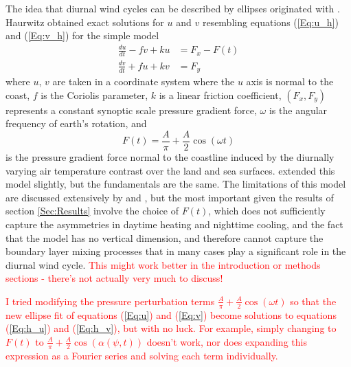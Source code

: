 \documentclass{ametsoc}
\begin{document}
The idea that diurnal wind cycles can be described by ellipses originated with \citet{haurwitz47}. Haurwitz obtained exact solutions for $u$ and $v$ resembling equations (\ref{Eq:u_h}) and (\ref{Eq:v_h}) for the simple model
\begin{align}
\frac{du}{dt} - fv + ku &= F_x - F(t) \label{Eq:h_u}\\
\frac{dv}{dt} + fu + kv &= F_y \label{Eq:h_v}
\end{align}
where $u$, $v$ are taken in a coordinate system where the $u$ axis is normal to the coast, $f$ is the Coriolis parameter, $k$ is a linear friction coefficient, $\left(F_x, F_y\right)$ represents a constant synoptic scale pressure gradient force, $\omega$ is the angular frequency of earth's rotation, and 
\begin{equation}
F(t) = \frac{A}{\pi} + \frac{A}{2} \cos \left(\omega t\right)
\end{equation}
is the pressure gradient force normal to the coastline induced by the diurnally varying air temperature contrast over the land and sea surfaces. \citet{kusuda83} extended this model slightly, but the fundamentals are the same. The limitations of this model are discussed extensively by \citet{haurwitz47} and \citet{kusuda83}, but the most important given the results of section \ref{Sec:Results} involve the choice of $F(t)$, which does not sufficiently capture the asymmetries in daytime heating and nighttime cooling, and the fact that the model has no vertical dimension, and therefore cannot capture the boundary layer mixing processes that in many cases play a significant role in the diurnal wind cycle. \textcolor{red}{This might work better in the introduction or methods sections - there's not actually very much to discuss!}

\textcolor{red}{I tried modifying the pressure perturbation terms $\frac{A}{\pi} + \frac{A}{2} \cos \left(\omega t\right)$ so that the new ellipse fit of equations (\ref{Eq:u}) and (\ref{Eq:v}) become solutions to equations (\ref{Eq:h_u}) and (\ref{Eq:h_v}), but with no luck. For example, simply changing to $F(t)$ to $\frac{A}{\pi} + \frac{A}{2} \cos \left(\alpha\left(\psi,t\right)\right)$ doesn't work, nor does expanding this expression as a Fourier series and solving each term individually.} 
\end{document}
